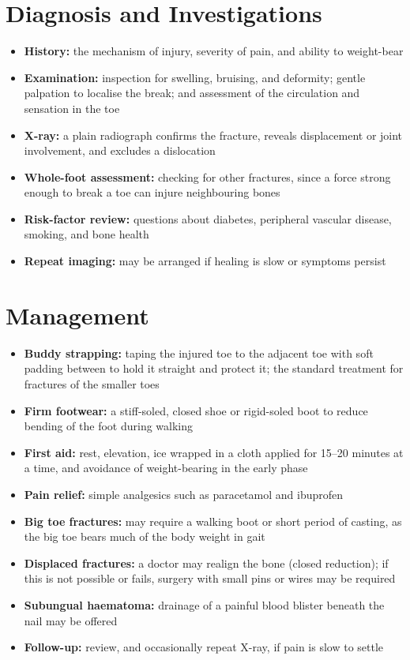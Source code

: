 \section*{Diagnosis and Investigations}
\begin{itemize}
    \item \textbf{History:} the mechanism of injury, severity of pain, and ability to weight-bear
    \item \textbf{Examination:} inspection for swelling, bruising, and deformity; gentle palpation to localise the break; and assessment of the circulation and sensation in the toe
    \item \textbf{X-ray:} a plain radiograph confirms the fracture, reveals displacement or joint involvement, and excludes a dislocation
    \item \textbf{Whole-foot assessment:} checking for other fractures, since a force strong enough to break a toe can injure neighbouring bones
    \item \textbf{Risk-factor review:} questions about diabetes, peripheral vascular disease, smoking, and bone health
    \item \textbf{Repeat imaging:} may be arranged if healing is slow or symptoms persist
\end{itemize}

\section*{Management}
\begin{itemize}
    \item \textbf{Buddy strapping:} taping the injured toe to the adjacent toe with soft padding between to hold it straight and protect it; the standard treatment for fractures of the smaller toes
    \item \textbf{Firm footwear:} a stiff-soled, closed shoe or rigid-soled boot to reduce bending of the foot during walking
    \item \textbf{First aid:} rest, elevation, ice wrapped in a cloth applied for 15--20 minutes at a time, and avoidance of weight-bearing in the early phase
    \item \textbf{Pain relief:} simple analgesics such as paracetamol and ibuprofen
    \item \textbf{Big toe fractures:} may require a walking boot or short period of casting, as the big toe bears much of the body weight in gait
    \item \textbf{Displaced fractures:} a doctor may realign the bone (closed reduction); if this is not possible or fails, surgery with small pins or wires may be required
    \item \textbf{Subungual haematoma:} drainage of a painful blood blister beneath the nail may be offered
    \item \textbf{Follow-up:} review, and occasionally repeat X-ray, if pain is slow to settle
\end{itemize}

